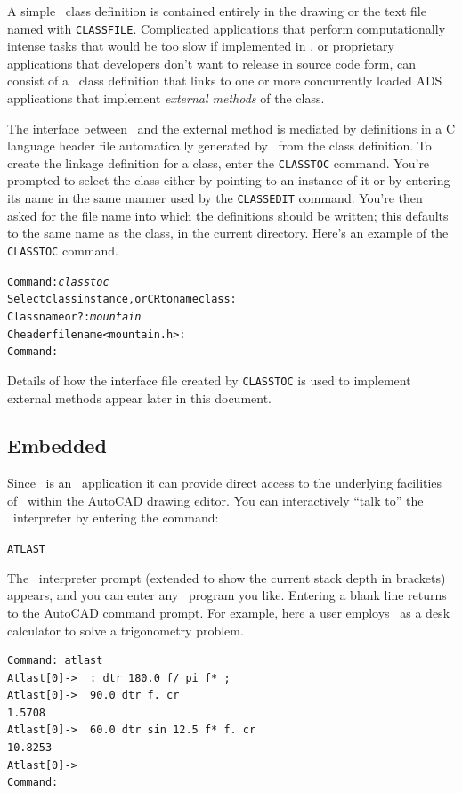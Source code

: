 \documentclass{article}
\begin{document}
A simple \cw\ class definition is contained entirely in the drawing or
the text file named with {\tt CLASSFILE}\@.  Complicated
applications that perform computationally intense tasks that would be
too slow if implemented in \atlas , or proprietary applications that
developers don't want to release in source code form, can consist of a
\cw\ class definition that links to one or more concurrently loaded
ADS applications that implement {\em external methods} of the class.

The interface between \cw\ and the external method is mediated by
definitions in a C language header file automatically generated by
\cw\ from the class definition.  To create the linkage definition for
a class, enter the {\tt CLASSTOC} command.  You're prompted to select
the class either by pointing to an instance of it or by entering its
name in the same manner used by the {\tt CLASSEDIT} command.  You're
then asked for the file name into which the definitions should be
written; this defaults to the same name as the class, in the current
directory.  Here's an example of the {\tt CLASSTOC} command.

\begin{alltt}
Command: {\em classtoc}
Select class instance, or CR to name class:
Class name or ?: {\em mountain}
C header file name <mountain.h>:
Command:
\end{alltt}

Details of how the interface file created by {\tt CLASSTOC} is used to
implement external methods appear later in this document.

\subsection{Embedded \atlas}

Since \cw\ is an \atlas\ application it can provide direct access to
the underlying facilities of \atlas\ within the AutoCAD drawing
editor.  You can interactively ``talk to'' the \atlas\ interpreter by
entering the command:

{\tt ATLAST}

The \atlas\ interpreter prompt (extended to show the current stack
depth in brackets) appears, and you can enter any \atlas\ program you
like.  Entering a blank line returns to the AutoCAD command prompt.
For example, here a user employs \atlas\ as a desk calculator to
solve a trigonometry problem.

\begin{verbatim}
Command: atlast
Atlast[0]->  : dtr 180.0 f/ pi f* ;
Atlast[0]->  90.0 dtr f. cr
1.5708
Atlast[0]->  60.0 dtr sin 12.5 f* f. cr
10.8253
Atlast[0]->
Command:
\end{verbatim}
\end{document}
